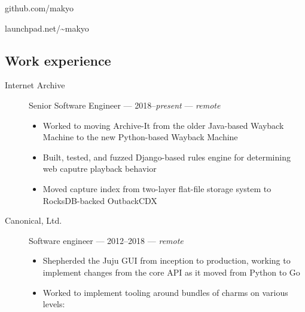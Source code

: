 \noindent github.com/makyo

\noindent launchpad.net/\textasciitilde{}makyo

\newpage

\subsection{Work experience}

\begin{description}
    \item[Internet Archive]
    Senior Software Engineer --- 2018--\emph{present} --- \emph{remote}

    \begin{itemize}
        \tightlist
        \item
        Worked to moving Archive-It from the older Java-based Wayback Machine to the new Python-based Wayback Machine
        \item
        Built, tested, and fuzzed Django-based rules engine for determining web caputre playback behavior
        \item
        Moved capture index from two-layer flat-file storage system to RocksDB-backed OutbackCDX
    \end{itemize}
    \item[Canonical, Ltd.]
    Software engineer --- 2012--2018 --- \emph{remote}

    \begin{itemize}
        \tightlist
        \item
        Shepherded the Juju GUI from inception to production, working to implement changes from the core API as it moved from Python to Go
        \item
        Worked to implement tooling around bundles of charms on various levels:


\end{itemize}
\end{description}
